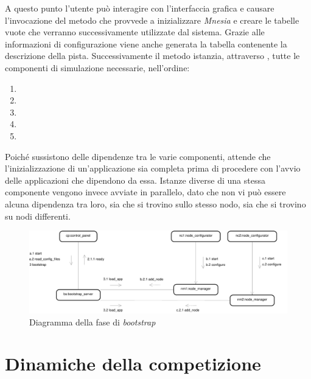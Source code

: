 A questo punto l'utente può interagire con l'interfaccia grafica e causare l'invocazione del metodo  che provvede a inizializzare \textsl{Mnesia} e creare le tabelle vuote che verranno successivamente utilizzate dal sistema. Grazie alle informazioni di configurazione viene anche generata la tabella contenente la descrizione della pista. Successivamente il metodo  istanzia, attraverso , tutte le componenti di simulazione necessarie, nell'ordine:
\begin{enumerate}
\item \evdisp{}
\item \sched{}
\item \weather{}
\item \team{}
\item \car{}
\end{enumerate}
Poiché sussistono delle dipendenze tra le varie componenti, \bootserv{} attende che l'inizializzazione di un'applicazione sia completa prima di procedere con l'avvio delle applicazioni che dipendono da essa. Istanze diverse di una stessa componente vengono invece avviate in parallelo, dato che non vi può essere alcuna dipendenza tra loro, sia che si trovino sullo stesso nodo, sia che si trovino su nodi differenti.

\begin{landscape}
\begin{figure}
\begin{center}
\includegraphics[height=.25\paperheight]{diagrammi/Bootstrap}
\caption{Diagramma della fase di \textit{bootstrap}}
\label{fig:bootstrap}
\end{center}
\end{figure}
\end{landscape}

\section{Dinamiche della competizione}
